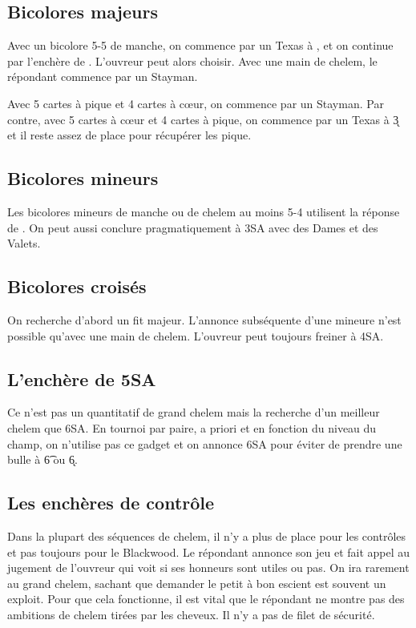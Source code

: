 \documentclass[a4paper,12pt]{article}
\begin{document}
\subsection*{Bicolores majeurs}

Avec un bicolore 5-5 de manche, on commence par un Texas à , et on continue par l'enchère de . L'ouvreur peut alors choisir. Avec une main de chelem, le répondant commence par un Stayman.

Avec 5 cartes à pique et 4 cartes à cœur, on commence par un Stayman. Par contre, avec 5 cartes à cœur et 4 cartes à pique, on commence par un Texas à \k3 et il reste assez de place pour récupérer les pique. 

\subsection*{Bicolores mineurs}

Les bicolores mineurs de manche ou de chelem au moins 5-4 utilisent la réponse de . On peut aussi conclure pragmatiquement à 3SA avec des Dames et des Valets.

\subsection*{Bicolores croisés}

On recherche d'abord un fit majeur. L'annonce subséquente d'une mineure n'est possible qu'avec une main de chelem. L'ouvreur peut toujours freiner à 4SA.



\subsection*{L'enchère de 5SA}

Ce n'est pas un quantitatif de grand chelem mais la recherche d'un meilleur chelem que 6SA. En tournoi par paire, a priori et en fonction du niveau du champ, on n'utilise pas ce gadget et on annonce 6SA pour éviter de prendre une bulle à \t6 ou \k6.

\subsection*{Les enchères de contrôle}

Dans la plupart des séquences de chelem, il n'y a plus de place pour les contrôles et pas toujours pour le Blackwood. Le répondant annonce son jeu et fait appel au jugement de l'ouvreur qui voit si ses honneurs sont utiles ou pas. On ira rarement au grand chelem, sachant que demander le petit à bon escient est souvent un exploit. Pour que cela fonctionne, il est vital que le répondant ne montre pas des ambitions de chelem tirées par les cheveux. Il n'y a pas de filet de sécurité.
\end{document}
